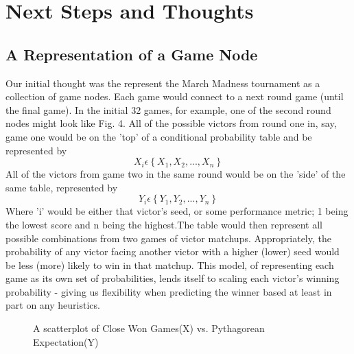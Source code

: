 \documentclass{acm_proc_article-sp}
\begin{document}
\section{Next Steps and Thoughts}
\subsection{A Representation of a Game Node}
Our initial thought was the represent the March Madness tournament as a collection of game nodes.
Each game would connect to a next round game (until the final game). In the initial
32 games, for example, one of the second round nodes might look like Fig. 4. All of the possible victors 
from round one in, say, game one would be on the 'top' of a conditional probability table and be represented by
\begin{equation}
X_{i} \epsilon \left \{ X_{1}, X_{2},..., X_{n}\right\}
\end{equation} 
All of the victors from game two in the same round would be on the 'side' of the same table, represented by 
\begin{equation}
Y_{i} \epsilon \left \{ Y_{1}, Y_{2},..., Y_{n}\right\}
\end{equation}
Where 'i' would be either that victor's seed, or some performance metric; 1 being the lowest score 
and n being the highest.The table would then represent all possible combinations from two games of victor matchups. Appropriately, the probability of any victor facing another victor with a higher (lower) seed would be less (more) likely to win in that matchup. This model, of representing each game as its own set of probabilities, lends itself to scaling each victor's winning probability - giving us flexibility when predicting the winner based at least in part on any heuristics.
\begin{figure}
\centering
{}
\caption{A scatterplot of Close Won Games(X) vs. Pythagorean Expectation(Y)}
\end{figure}
\end{document}
